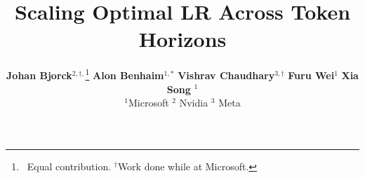 \documentclass{article} %
\title{Scaling Optimal LR Across Token Horizons}
\author{%
\normalsize \textbf{Johan Bjorck}$^{2,\dagger,}$\thanks{~Equal contribution. $^\dagger$Work done while at Microsoft.}
\quad  \textbf{Alon Benhaim}$^{1,*}$
\quad  \textbf{Vishrav Chaudhary}$^{3,\dagger}$
\quad  \textbf{Furu Wei}$^1$
\quad  \textbf{Xia Song }$^1$ \\
\normalsize $^1$Microsoft
\quad $^2$ Nvidia 
\quad $^3$ Meta
\quad 
}
\begin{document}
\maketitle
\begin{abstract}

\end{abstract}










\newpage
\appendix

\end{document}
